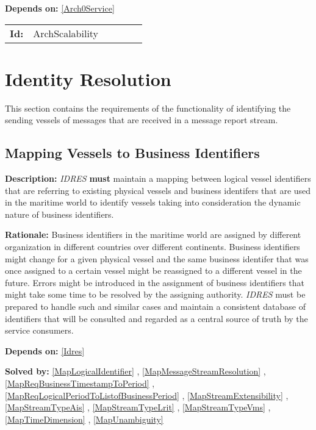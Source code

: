 \textbf{Depends on:} \ref{Arch0Service} 

\par
{\small \begin{center}\begin{tabular}{rlrlrl}
\textbf{Id:} & ArchScalability  & & & \end{tabular}\end{center} }

\section{Identity Resolution}
This section contains the requirements of the functionality of  identifying the sending vessels of messages that are received in a message report stream.
\subsection{Mapping Vessels to Business Identifiers}\label{Map0BusinessIdentifier}
\textbf{Description:} \textsl{IDRES} \textbf{must} maintain a mapping between logical vessel identifiers that are referring  to existing physical vessels and business identifers that are used in the maritime world to  identify vessels taking into consideration the dynamic nature of  business identifiers.

\textbf{Rationale:} Business identifiers in the maritime world are assigned by different organization in different countries over different continents.  Business identifiers might change for a given physical vessel and the same business identifer that was once assigned to a certain vessel might be reassigned to a different vessel in the future. Errors might be introduced in the assignment of  business identifiers that might take some time to be resolved by the assigning authority.  \textsl{IDRES} must be prepared to handle such and similar cases  and maintain a consistent database of identifiers that will be consulted  and regarded as a central source of truth by the service consumers.

\textbf{Depends on:} \ref{Idres} 

\textbf{Solved by:} \ref{MapLogicalIdentifier} , \ref{MapMessageStreamResolution} , \ref{MapReqBusinessTimestampToPeriod} , \ref{MapReqLogicalPeriodToListofBusinessPeriod} , \ref{MapStreamExtensibility} , \ref{MapStreamTypeAis} , \ref{MapStreamTypeLrit} , \ref{MapStreamTypeVms} , \ref{MapTimeDimension} , \ref{MapUnambiguity} 

